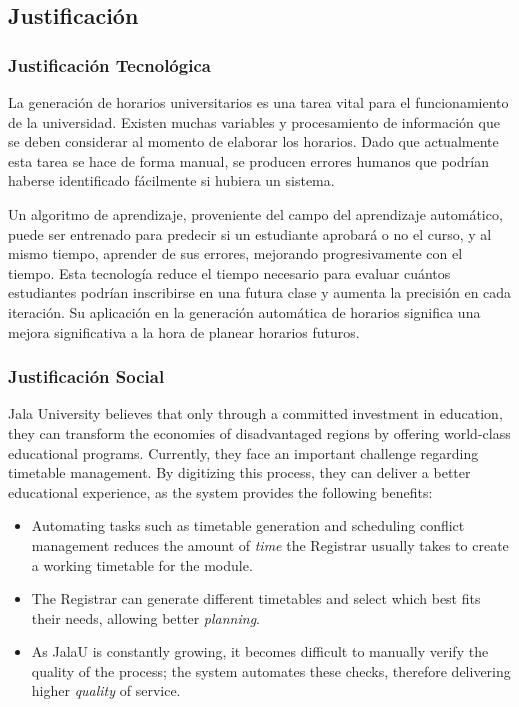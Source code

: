 \subsection{Justificación}

\subsubsection{Justificación Tecnológica}
La generación de horarios universitarios es una tarea vital para el funcionamiento de la universidad.
Existen muchas variables y procesamiento de información que se deben considerar al momento de elaborar los horarios. Dado que actualmente esta tarea se hace de forma manual, se producen errores humanos que podrían haberse identificado fácilmente si hubiera un sistema.

Un algoritmo de aprendizaje, proveniente del campo del aprendizaje automático, puede ser entrenado para predecir si un estudiante aprobará o no el curso, y al mismo tiempo, aprender de sus errores, mejorando progresivamente con el tiempo.
Esta tecnología reduce el tiempo necesario para evaluar cuántos estudiantes podrían inscribirse en una futura clase y aumenta la precisión en cada iteración. Su aplicación en la generación automática de horarios significa una mejora significativa a la hora de planear horarios futuros.

\subsubsection{Justificación Social}
Jala University believes that only through a committed investment in education, they can transform the economies of disadvantaged regions by offering world-class educational programs.
Currently, they face an important challenge regarding timetable management. By digitizing this process, they can deliver a better educational experience, as the system provides the following benefits:

\begin{itemize}
    \item Automating tasks such as timetable generation and scheduling conflict management reduces the amount of \textit{time} the Registrar usually takes to create a working timetable for the module.
    \item The Registrar can generate different timetables and select which best fits their needs, allowing better \textit{planning}.
    \item As JalaU is constantly growing, it becomes difficult to manually verify the quality of the process; the system automates these checks, therefore delivering higher \textit{quality} of service.
\end{itemize}

